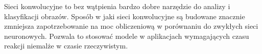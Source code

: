 \documentclass[a4paper,12pt,oneside]{book} %
\begin{document}
Sieci konwolucyjne to bez wątpienia bardzo dobre narzędzie do analizy i klasyfikacji obrazów. Sposób w jaki sieci konwolucyjne są budowane znacznie zmniejsza zapotrzebowanie na moc obliczeniową w porównaniu do zwykłych sieci neuronowych. Pozwala to stosować modele w aplikacjach wymagających czasu reakcji niemalże w czasie rzeczywistym. 

\listoftables{} %

\listoffigures{} %

\lstlistoflistings
{}



\end{document}

